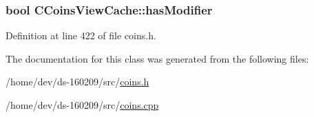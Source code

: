 \subsubsection[{has\+Modifier}]{\setlength{\rightskip}{0pt plus 5cm}bool C\+Coins\+View\+Cache\+::has\+Modifier\hspace{0.3cm}{\ttfamily [protected]}}\label{class_c_coins_view_cache_a363e27234d36bb0fc533d60cd64d1bc3}


Definition at line 422 of file coins.\+h.



The documentation for this class was generated from the following files\+:\begin{DoxyCompactItemize}
\item 
/home/dev/ds-\/160209/src/\hyperlink{coins_8h}{coins.\+h}\item 
/home/dev/ds-\/160209/src/\hyperlink{coins_8cpp}{coins.\+cpp}\end{DoxyCompactItemize}
